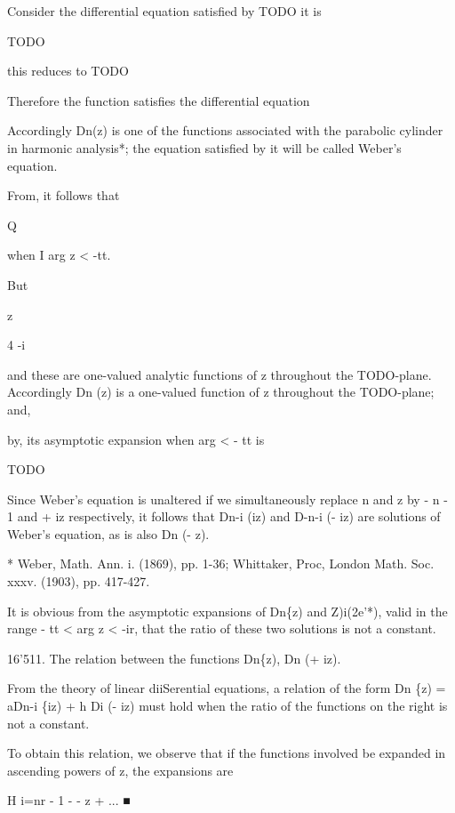 
Consider the differential equation satisfied by TODO it is

TODO

this reduces to TODO

Therefore the function satisfies the differential equation

Accordingly Dn(z) is one of the functions associated with the
parabolic cylinder in harmonic analysis*; the equation satisfied by it
will be called Weber's equation.

From, it follows that

Q

when I arg z < -tt.

But

z

4 -i

and these are one-valued analytic functions of z throughout the
TODO-plane. Accordingly Dn (z) is a one-valued function of z
throughout the TODO-plane; and,

by, its asymptotic expansion when arg  < - tt is

TODO


Since Weber's equation is unaltered if we simultaneously replace n and
z by - n - 1 and + iz respectively, it follows that Dn-i (iz) and
D-n-i (- iz) are solutions of Weber's equation, as is also Dn (- z).

* Weber, Math. Ann. i. (1869), pp. 1-36; Whittaker, Proc, London Math.
Soc. xxxv. (1903), pp. 417-427.

%
%

It is obvious from the asymptotic expansions of Dn\{z) and
Z)i(2e'*), valid in the range -  tt < arg z < -ir, that the
ratio of these two solutions is not a constant.

16'511. The relation between the functions Dn\{z), Dn (+ iz).

From the theory of linear diiSerential equations, a relation of the
form Dn \{z) = aDn-i \{iz) + h Di (- iz) must hold when the
ratio of the functions on the right is not a constant.

To obtain this relation, we observe that if the functions involved be
expanded in ascending powers of z, the expansions are

H i=nr - 1 -  - z + ... ■

